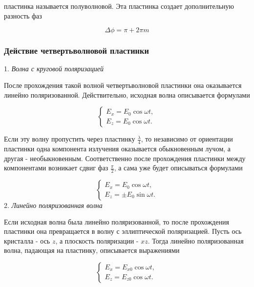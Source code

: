 пластинка называется полуволновой. Эта пластинка создает дополнительную разность фаз 

\begin{equation*}
    \Delta \phi = \pi + 2\pi m
\end{equation*}

\subsubsection{Действие четвертьволновой  пластинки}

1. \textit{Волна с круговой поляризацией}

После прохождения такой волной четвертьволновой пластинки она оказывается линейно поляризованной. Действительно, исходная волна описывается формулами

\begin{equation*}
 \begin{cases}
   E_x = E_0 \cos \omega t,
   \\
   E_z = E_0 \cos \omega t.
 \end{cases}
\end{equation*}

Если эту волну пропустить через пластинку $\frac{\lambda}{4}$, то независимо от ориентации пластинки одна компонента излучения оказывается обыкновенным лучом, а другая - необыкновенным. Соответственно после прохождения пластинки между компонентами возникает сдвиг фаз $\frac{\pi}{2}$, а сама уже будет описываться формулами

\begin{equation*}
 \begin{cases}
   E_x = E_0 \cos \omega t,
   \\
   E_z = \pm E_0 \sin \omega t.
 \end{cases}
\end{equation*}
2. \textit{Линейно поляризованная волна}

Если исходная волна была линейно поляризованной, то после прохождения пластинки она превращается в волну с эллиптической поляризацией. Пусть ось кристалла - ось $z$, а плоскость поляризации - $xz$. Тогда линейно поляризованная волна, падающая на пластинку, описывается выражениями

\begin{equation*}
 \begin{cases}
   E_x = E_{x0} \cos \omega t,
   \\
   E_z = E_{z0} \cos \omega t.
 \end{cases}
\end{equation*}

